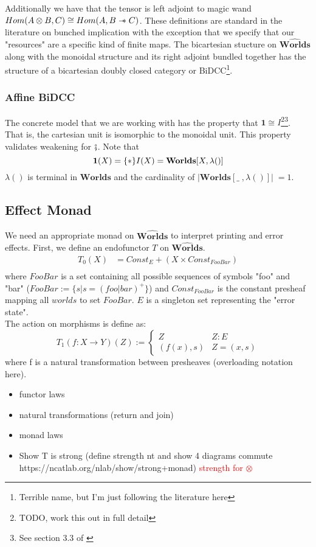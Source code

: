 \documentclass{article}
\newcommand{\red}[1]{\textcolor{red}{#1}}
\newcommand\sep{\mathrel{-\mkern-6mu*}}
\newcommand{\worlds}{\widehat{\mathbf{Worlds}}}
\begin{document}
Additionally we have that the tensor is left adjoint to magic wand $Hom(A \otimes B , C) \cong Hom(A , B \sep C)$. These definitions are standard in the literature on bunched implication with the exception that we specify that our "resources" are a specific kind of finite maps. The bicartesian stucture on $\worlds$ along with the monoidal structure and its right adjoint bundled together has the structure of a bicartesian doubly closed category or BiDCC\footnote{Terrible name, but I'm just following the literature here}.

\subsubsection{Affine BiDCC}
The concrete model that we are working with has the property that $\mathbf{1} \cong I$\footnote{TODO, work this out in full detail}\footnote{See section 3.3 of \cite{pym_semantics_2002}}. That is, the cartesian unit is isomorphic to the monoidal unit. This property validates weakening for $\fatsemi$. Note that
\[ 
    \mathbf{1}(X) = \{*\} \\
    I(X) = \mathbf{Worlds}[X , \lambda()]
\]
$\lambda()$ is terminal in $\mathbf{Worlds}$ and the cardinality of $|\mathbf{Worlds}[\_\;,\lambda()]| \;= 1$.
\subsection{Effect Monad}
We need an appropriate monad on $\worlds$ to interpret printing and error effects. First, we define an endofunctor $T$ on $\worlds$.
\begin{align*}
    T_0(X) &= Const_E + (X \times Const_{FooBar})\\
\end{align*}
where $FooBar$ is a set containing all possible sequences of symbols "foo" and "bar" ($FooBar := \{s | s = (foo | bar)^+\}$) and $Const_{FooBar}$ is the constant presheaf mapping all $worlds$ to set $FooBar$. $E$ is a singleton set representing the "error state".
\\
The action on morphisms is define as: 
\[ 
T_1(f: X \rightarrow Y)(Z) :=\begin{cases} 
      Z & Z: E \\
      (f(x), s) & Z = (x,s)
      \end{cases}
\]
where f is a natural transformation between presheaves (overloading notation here).
\begin{itemize}
    \item functor laws
    \item natural transformations (return and join)
    \item monad laws
    \item Show T is strong (define strength nt and show 4 diagrams commute https://ncatlab.org/nlab/show/strong+monad) \red{strength for $\otimes$}
\end{itemize}
\end{document}
